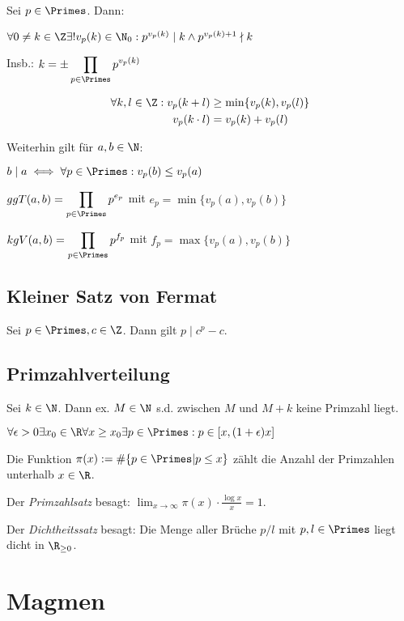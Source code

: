 Sei $p \in \Primes$. Dann:

$\forall 0 \neq k \in \Z \exists! v_p(k) \in \N_0 : p^{v_p(k)} \mid k \land p^{v_p(k)+1} \nmid k$

Insb.: $k = \pm \displaystyle\prod_{p \in \Primes} p^{v_p(k)}$

\vspace*{-4mm}
\begin{align*}
\forall k, l \in \Z: v_p(k+l)   &\geq \min\{v_p(k),v_p(l)\} \\
             v_p(k \cdot l) &= v_p(k) + v_p(l)
\end{align*}

Weiterhin gilt für $a, b \in \N$:

$b \mid a \iff \forall p \in \Primes : v_p(b) \leq v_p(a)$

$ggT(a,b) = \displaystyle\prod_{p \in \Primes} p^{e_p}$ mit $e_p = \min\{v_p(a),v_p(b)\}$

$kgV(a,b) = \displaystyle\prod_{p \in \Primes} p^{f_p}$ mit $f_p = \max\{v_p(a),v_p(b)\}$

\subsection*{Kleiner Satz von Fermat}

Sei $p \in \Primes, c \in \Z$. Dann gilt $p \mid c^p - c$.

\subsection*{Primzahlverteilung}

Sei $k \in \N$. Dann ex. $M \in \N$ s.d. zwischen $M$ und $M+k$ keine Primzahl liegt.

$\forall \epsilon > 0 \exists x_0 \in \R \forall x \geq x_0 \exists p \in \Primes : p \in [x,(1+\epsilon)x]$

\vspace*{2mm}

Die Funktion $\pi(x) := \#\{ p \in \Primes | p \leq x \}$ zählt die Anzahl der Primzahlen unterhalb $x \in \R$.

Der \emph{Primzahlsatz} besagt: $\lim_{x \to \infty} \pi(x) \cdot \frac{\log{x}}{x} = 1$.

Der \emph{Dichtheitssatz} besagt: Die Menge aller Brüche $p/l$ mit $p, l \in \Primes$ liegt dicht in $\R_{\geq 0}$.

\section*{Magmen}

